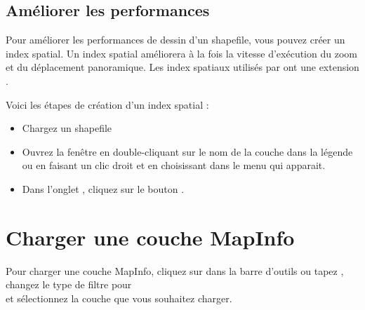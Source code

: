 \subsection{Améliorer les performances}

Pour améliorer les performances de dessin d'un shapefile, vous pouvez créer 
un index spatial. Un  index spatial 
améliorera à la fois la vitesse d'exécution du zoom et du déplacement 
panoramique. Les index spatiaux utilisés par \qg ont une extension .

Voici les étapes de création d'un index spatial :

\begin{itemize}[label=--]
\item Chargez un shapefile
\item Ouvrez la fenêtre  en double-cliquant sur 
le nom de la couche dans la légende ou en faisant un clic droit et en choisissant 
 dans le menu qui apparait.
\item Dans l'onglet , cliquez sur le bouton .
\end{itemize}

\section{Charger une couche MapInfo}

Pour charger une couche MapInfo, cliquez sur 
 dans la barre d'outils 
ou tapez , changez le type de filtre pour\\  et sélectionnez la couche que vous 
souhaitez charger.


